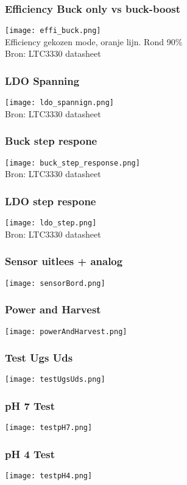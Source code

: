 \begin{frame}
    \frametitle{Efficiency Buck only vs buck-boost}
    \centering
    \texttt{[image: effi\_buck.png]}\\
    Efficiency gekozen mode, oranje lijn. Rond 90\%\\
    Bron: LTC3330 datasheet
\end{frame}

\begin{frame}
    \frametitle{LDO Spanning}
    \centering
    \texttt{[image: ldo\_spannign.png]}\\
    Bron: LTC3330 datasheet
\end{frame}

\begin{frame}
    \frametitle{Buck step respone}
    \centering
    \texttt{[image: buck\_step\_response.png]}\\
    Bron: LTC3330 datasheet
\end{frame}

\begin{frame}
    \frametitle{LDO step respone}
    \centering
    \texttt{[image: ldo\_step.png]}\\
    Bron: LTC3330 datasheet
\end{frame}

\begin{frame}
    \frametitle{Sensor uitlees + analog}
    \centering
    \texttt{[image: sensorBord.png]}\\
\end{frame}

\begin{frame}
    \frametitle{Power and Harvest}
    \centering
    \texttt{[image: powerAndHarvest.png]}\\
\end{frame}

\begin{frame}
    \frametitle{Test Ugs Uds}
    \centering
    \texttt{[image: testUgsUds.png]}\\
\end{frame}

\begin{frame}
    \frametitle{pH 7 Test}
    \centering
    \texttt{[image: testpH7.png]}\\
\end{frame}

\begin{frame}
    \frametitle{pH 4 Test}
    \centering
    \texttt{[image: testpH4.png]}\\
\end{frame}
